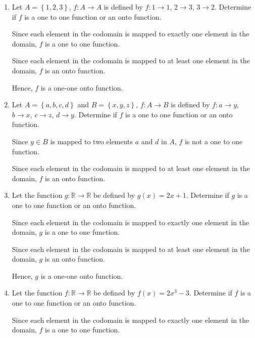 \documentclass[12pt]{report}
\begin{document}
\begin{enumerate}
      \item Let $A = \left\{1, 2, 3\right\}$, $f: A \to A$ is defined by $f: 1 \to 1$, $2
                  \to 3$, $3 \to 2$. Determine if $f$ is a one to one function or an onto
            function. \sol{}

            Since each element in the codomain is mapped to exactly one element in the
            domain, $f$ is a one to one function.

            Since each element in the codomain is mapped to at least one element in the
            domain, $f$ is an onto function.

            Hence, $f$ is a one-one onto function.

      \item Let $A = \left\{a, b, c, d\right\}$ and $B = \left\{x, y, z\right\}$, $f: A \to
                  B$ is defined by $f: a \to y$, $b \to x$, $c \to z$, $d \to y$. Determine if
            $f$ is a one to one function or an onto function. \sol{}

            Since $y \in B$ is mapped to two elements $a$ and $d$ in $A$, $f$ is not a one
            to one function.

            Since each element in the codomain is mapped to at least one element in the
            domain, $f$ is an onto function.

      \item Let the function $g: \mathbb{R} \to \mathbb{R}$ be defined by $g(x) = 2x + 1$.
            Determine if $g$ is a one to one function or an onto function. \sol{}

            Since each element in the codomain is mapped to exactly one element in the
            domain, $g$ is a one to one function.

            Since each element in the codomain is mapped to at least one element in the
            domain, $g$ is an onto function.

            Hence, $g$ is a one-one onto function.

      \item Let the function $f: \mathbb{R} \to \mathbb{R}$ be defined by $f (x) = 2x^3 -
                  3$. Determine if $f$ is a one to one function or an onto function. \sol{}

            Since each element in the codomain is mapped to exactly one element in the
            domain, $f$ is a one to one function.


\end{enumerate}
\end{document}
